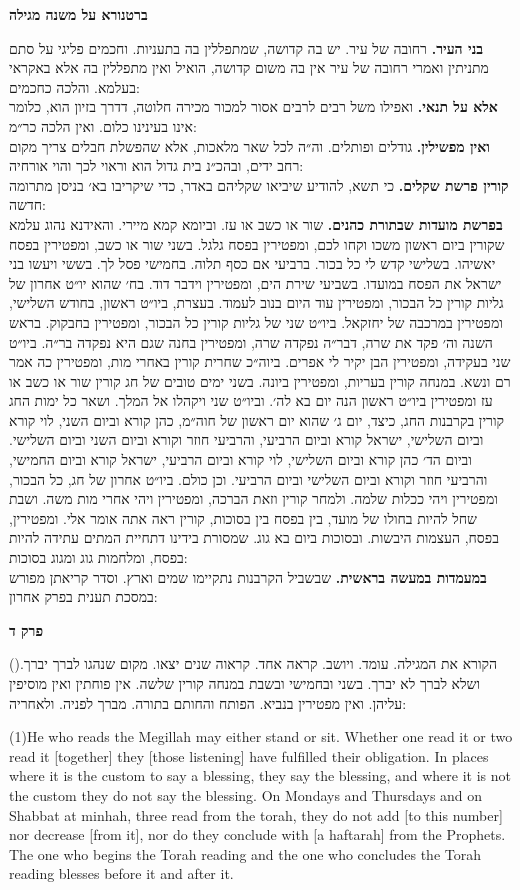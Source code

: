 \documentclass[12pt, openany]{book}
\newcommand{\sethebfont}{
\fontsize{10.5pt}{13.1pt} \selectfont
}
\newcommand{\LTRmark}{‎}
\newcommand{\hebeng}[2]{
	{\sethebfont #1}
	
	{\beginL\englishfont\sethebfont{\raggedright #2 \hfill} \LTRmark\endL}
	
	\vspace{\baselineskip}
}
\newcommand{\chapname}{}
\newcommand{\sectname}{}
\newcommand{\newchap}[1]{
	\addcontentsline{toc}{chapter}{#1}
	\renewcommand{\chapname}{#1}
		\begin{center}
			\textbf{%
\fontsize{16pt}{16pt}\selectfont
				#1}
		\end{center}
}
\newcommand{\newsection}[1]{
	\renewcommand{\sectname}{#1}	
	\vspace{-\baselineskip}
	\begin{center}
		\textbf{%
\fontsize{16pt}{16pt}\selectfont
			#1}
	\end{center}
	\vspace{-\baselineskip}
	\nopagebreak
}
\newcommand{\blockcomment}[2]{ 
\vspace{\baselineskip}
\newsection{#1}
\sethebfont	\textsf{#2}
\vspace{\baselineskip}}
\newcommand{\vsnum}[1]{(\hebrewnumeral{#1})\space}
\newcommand{\vsnumeng}[1]{(#1)\space}
\begin{document}
\blockcomment{ברטנורא על משנה מגילה}{\textrm{\textbf{בני העיר.}} רחובה של עיר. יש בה קדושה, שמתפללין בה בתעניות. וחכמים פליגי על סתם מתניתין ואמרי רחובה של עיר אין בה משום קדושה, הואיל ואין מתפללין בה אלא באקראי בעלמא. והלכה כחכמים:\\\textrm{\textbf{אלא על תנאי.}} ואפילו משל רבים לרבים אסור למכור מכירה חלוטה, דדרך בזיון הוא, כלומר אינו בעינינו כלום. ואין הלכה כר״מ:\\\textrm{\textbf{ואין מפשילין.}} גודלים ופותלים. וה״ה לכל שאר מלאכות, אלא שהפשלת חבלים צריך מקום רחב ידים, ובהכ״נ בית גדול הוא וראוי לכך והוי אורחיה:\\\textrm{\textbf{קורין פרשת שקלים.}} כי תשא, להודיע שיביאו שקליהם באדר, כדי שיקריבו בא׳ בניסן מתרומה חדשה:\\\textrm{\textbf{בפרשת מועדות שבתורת כהנים.}} שור או כשב או עז. וביומא קמא מיירי. והאידנא נהוג עלמא שקורין ביום ראשון משכו וקחו לכם, ומפטירין בפסח גלגל. בשני שור או כשב, ומפטירין בפסח יאשיהו. בשלישי קדש לי כל בכור. ברביעי אם כסף תלוה. בחמישי פסל לך. בששי ויעשו בני ישראל את הפסח במועדו. בשביעי שירת הים, ומפטירין וידבר דוד. בח׳ שהוא יו״ט אחרון של גליות קורין כל הבכור, ומפטירין עוד היום בנוב לעמוד. בעצרת, ביו״ט ראשון, בחודש השלישי, ומפטירין במרכבה של יחזקאל. ביו״ט שני של גליות קורין כל הבכור, ומפטירין בחבקוק. בראש השנה וה׳ פקד את שרה, דבר״ה נפקדה שרה, ומפטירין בחנה שגם היא נפקדה בר״ה. ביו״ט שני בעקידה, ומפטירין הבן יקיר לי אפרים. ביוה״כ שחרית קורין באחרי מות, ומפטירין כה אמר רם ונשא. במנחה קורין בעריות, ומפטירין ביונה. בשני ימים טובים של חג קורין שור או כשב או עז ומפטירין ביו״ט ראשון הנה יום בא לה׳. וביו״ט שני ויקהלו אל המלך. ושאר כל ימות החג קורין בקרבנות החג, כיצד, יום ג׳ שהוא יום ראשון של חוה״מ, כהן קורא וביום השני, לוי קורא וביום השלישי, ישראל קורא וביום הרביעי, והרביעי חוזר וקורא וביום השני וביום השלישי. וביום הד׳ כהן קורא וביום השלישי, לוי קורא וביום הרביעי, ישראל קורא וביום החמישי, והרביעי חוזר וקורא וביום השלישי וביום הרביעי. וכן כולם. ביו״ט אחרון של חג, כל הבכור, ומפטירין ויהי ככלות שלמה. ולמחר קורין וזאת הברכה, ומפטירין ויהי אחרי מות משה. ושבת שחל להיות בחולו של מועד, בין בפסח בין בסוכות, קורין ראה אתה אומר אלי. ומפטירין, בפסח, העצמות היבשות. ובסוכות ביום בא גוג. שמסורת בידינו דתחיית המתים עתידה להיות בפסח, ומלחמות גוג ומגוג בסוכות: \\\textrm{\textbf{במעמדות במעשה בראשית.}} שבשביל הקרבנות נתקיימו שמים וארץ. וסדר קריאתן מפורש במסכת תענית בפרק אחרון:\\
}%
\newchap{פרק ד}
\hebeng{\vsnum{1}הקורא את המגילה. עומד. ויושב. קראה אחד. קראוה שנים יצאו. מקום שנהגו לברך יברך. ושלא לברך לא יברך. בשני ובחמישי ובשבת במנחה קורין שלשה. אין פוחתין ואין מוסיפין עליהן. ואין מפטירין בנביא. הפותח והחותם בתורה. מברך לפניה. ולאחריה: }{\vsnumeng{1}He who reads the Megillah may either stand or sit. Whether one read it or two read it {[together]} they {[those listening]} have fulfilled their obligation. In places where it is the custom to say a blessing, they say the blessing, and where it is not the custom they do not say the blessing. On Mondays and Thursdays and on Shabbat at minhah, three read from the torah, they do not add {[to this number]} nor decrease {[from it]}, nor do they conclude with {[a haftarah]} from the Prophets. The one who begins the Torah reading and the one who concludes the Torah reading blesses before it and after it.}%
\end{document}

